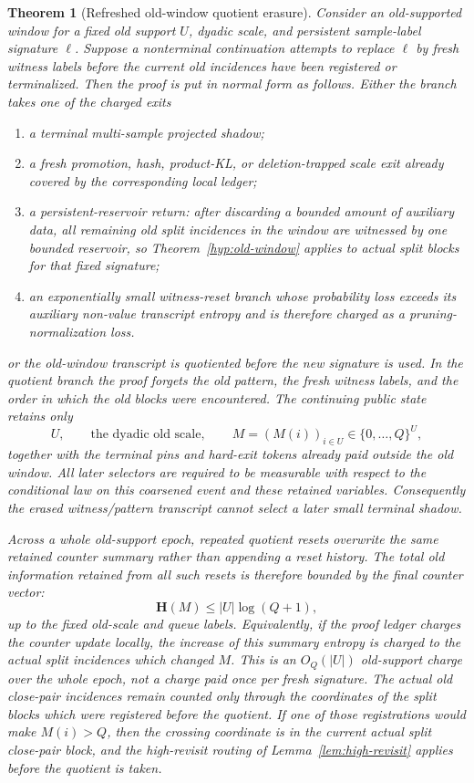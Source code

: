 \documentclass[11pt]{article}
\newtheorem{theorem}{Theorem}[section]
\newcommand{\bfH}{\mathbf H}
\begin{document}
\begin{theorem}[Refreshed old-window quotient erasure]
\label{hyp:witness-reset}
Consider an old-supported window for a fixed old support $U$, dyadic scale,
and persistent sample-label signature $\ell$.  Suppose a nonterminal
continuation attempts to replace $\ell$ by fresh witness labels before the
current old incidences have been registered or terminalized.  Then the proof is
put in normal form as follows.  Either the branch takes one of the charged
exits
\begin{enumerate}[label=\textup{(\roman*)}]
\item a terminal multi-sample projected shadow;
\item a fresh promotion, hash, product-KL, or deletion-trapped scale exit
already covered by the corresponding local ledger;
\item a persistent-reservoir return: after discarding a bounded amount of
auxiliary data, all remaining old split incidences in the window are witnessed
by one bounded reservoir, so Theorem~\ref{hyp:old-window} applies to actual
split blocks for that fixed signature;
\item an exponentially small witness-reset branch whose probability loss
exceeds its auxiliary non-value transcript entropy and is therefore charged as
a pruning-normalization loss.
\end{enumerate}
or the old-window transcript is quotiented before the new signature is used.
In the quotient branch the proof forgets the old pattern, the fresh witness
labels, and the order in which the old blocks were encountered.  The continuing
public state retains only
\[
  U,\qquad \text{the dyadic old scale},\qquad
  M=(M(i))_{i\in U}\in\{0,\ldots,Q\}^U,
\]
together with the terminal pins and hard-exit tokens already paid outside the
old window.  All later selectors are required to be measurable with respect to
the conditional law on this coarsened event and these retained variables.
Consequently the erased witness/pattern transcript cannot select a later small
terminal shadow.

Across a whole old-support epoch, repeated quotient resets overwrite the same
retained counter summary rather than appending a reset history.  The total
old information retained from all such resets is therefore bounded by the final
counter vector:
\[
  \bfH(M)\le |U|\log(Q+1),
\]
up to the fixed old-scale and queue labels.  Equivalently, if the proof ledger
charges the counter update locally, the increase of this summary entropy is
charged to the actual split incidences which changed $M$.  This is an
$O_Q(|U|)$ old-support charge over the whole epoch, not a charge paid once per
fresh signature.  The actual old close-pair incidences remain counted only
through the coordinates of the split blocks which were registered before the
quotient.  If one of those registrations would make $M(i)>Q$, then the crossing
coordinate is in the current actual split close-pair block, and the
high-revisit routing of Lemma~\ref{lem:high-revisit} applies before the
quotient is taken.
\end{theorem}
\end{document}

